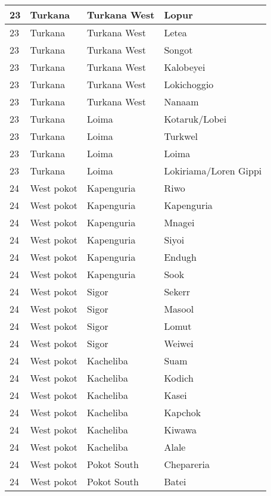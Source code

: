 \begin{table}[!ht]
\begin{tabular}{|l|l|l|l|}
        23 & Turkana & Turkana West & Lopur \\ \hline
        23 & Turkana & Turkana West & Letea \\ \hline
        23 & Turkana & Turkana West & Songot \\ \hline
        23 & Turkana & Turkana West & Kalobeyei \\ \hline
        23 & Turkana & Turkana West & Lokichoggio \\ \hline
        23 & Turkana & Turkana West & Nanaam \\ \hline
        23 & Turkana & Loima & Kotaruk/Lobei \\ \hline
        23 & Turkana & Loima & Turkwel \\ \hline
        23 & Turkana & Loima & Loima \\ \hline
        23 & Turkana & Loima & Lokiriama/Loren Gippi \\ \hline
        24 & West pokot & Kapenguria & Riwo \\ \hline
        24 & West pokot & Kapenguria & Kapenguria \\ \hline
        24 & West pokot & Kapenguria & Mnagei \\ \hline
        24 & West pokot & Kapenguria & Siyoi \\ \hline
        24 & West pokot & Kapenguria & Endugh \\ \hline
        24 & West pokot & Kapenguria & Sook \\ \hline
        24 & West pokot & Sigor & Sekerr \\ \hline
        24 & West pokot & Sigor & Masool \\ \hline
        24 & West pokot & Sigor & Lomut \\ \hline
        24 & West pokot & Sigor & Weiwei \\ \hline
        24 & West pokot & Kacheliba & Suam \\ \hline
        24 & West pokot & Kacheliba & Kodich \\ \hline
        24 & West pokot & Kacheliba & Kasei \\ \hline
        24 & West pokot & Kacheliba & Kapchok \\ \hline
        24 & West pokot & Kacheliba & Kiwawa \\ \hline
        24 & West pokot & Kacheliba & Alale \\ \hline
        24 & West pokot & Pokot South & Chepareria \\ \hline
        24 & West pokot & Pokot South & Batei \\ \hline

\end{tabular}
\end{table}
